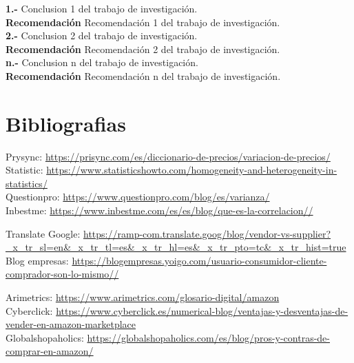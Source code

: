 \documentclass[oneside,11pt]{Latex/Classes/PhDthesisPSnPDF}
\begin{document}
\textbf{1.-} Conclusion 1 del trabajo de investigación.\\

\textbf{Recomendación} Recomendación 1 del trabajo de investigación.\\

\textbf{2.-} Conclusion 2 del trabajo de investigación.\\

\textbf{Recomendación} Recomendación 2 del trabajo de investigación.\\

\textbf{n.-} Conclusion n del trabajo de investigación.\\

\textbf{Recomendación} Recomendación n del trabajo de investigación.\\

\appendix
\renewcommand{\thechapter}{\Alph{chapter}}

\chapter{Bibliografias}

Prysync:
\url{https://prisync.com/es/diccionario-de-precios/variacion-de-precios/}\\

Statistic:
\url{https://www.statisticshowto.com/homogeneity-and-heterogeneity-in-statistics/}\\

Questionpro: \url{https://www.questionpro.com/blog/es/varianza/}\\

Inbestme:
\url{https://www.inbestme.com/es/es/blog/que-es-la-correlacion//}

Translate Google:
\url{https://ramp-com.translate.goog/blog/vendor-vs-supplier?_x_tr_sl=en&_x_tr_tl=es&_x_tr_hl=es&_x_tr_pto=tc&_x_tr_hist=true}\\

Blog empresas:
\url{https://blogempresas.yoigo.com/usuario-consumidor-cliente-comprador-son-lo-mismo//}

Arimetrics: \url{https://www.arimetrics.com/glosario-digital/amazon}\\

Cyberclick:
\url{https://www.cyberclick.es/numerical-blog/ventajas-y-desventajas-de-vender-en-amazon-marketplace}\\

Globalshopaholics:
\url{https://globalshopaholics.com/es/blog/pros-y-contras-de-comprar-en-amazon/}\\
\end{document}
